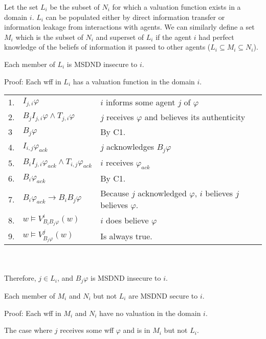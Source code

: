 Let the set $L_i$ be the subset of $N_i$ for which a valuation function exists in a domain $i$. $L_i$ can be populated either by direct information transfer or information leakage from interactions with agents. We can similarly define a set $M_i$ which is the subset of $N_i$ and superset of $L_i$ if the agent $i$ had perfect knowledge of the beliefs of information it passed to other agents ($L_i \subseteq M_i \subseteq N_i$).

\begin{thm}
Each member of $L_i$ is MSDND insecure to $i$.
\end{thm}

Proof: Each wff in $L_i$ has a valuation function in the domain $i$.

\begin{table}[h!]
\centering
\small
\begin{tabularx}{\linewidth}{l l X}
1. & $I_{j,i} \varphi$ & $i$ informs some agent $j$ of $\varphi$ \\
2. & $B_{j}I_{j,i} \varphi \wedge T_{j,i} \varphi$ & $j$ receives $\varphi$ and believes its authenticity \\
3  & $B_j \varphi$ & By C1. \\
4. & $I_{i,j} \varphi_{ack}$ & $j$ acknowledges $B_j \varphi$ \\
5. & $B_{i}I_{j,i} \varphi_{ack} \wedge T_{i,j} \varphi_{ack}$ & $i$ receives $\varphi_{ack}$ \\
6. & $B_{i} \varphi_{ack}$ & By C1. \\
7. & $B_{i} \varphi_{ack} \rightarrow B_i B_j \varphi$ & Because $j$ acknowledged $\varphi$, $i$ believes $j$ believes $\varphi$. \\
8. & $w \vDash V_{B_i B_j \varphi}^{i}(w)$ & $i$ does believe $\varphi$ \\
9. & $w \vDash V_{B_j \varphi}^{j}(w)$ & Is always true. %
\end{tabularx} \\~\\
Therefore, $j \in L_i$, and $B_j \varphi$ is MSDND insecure to $i$.
\label{tab:lsetsecurity}
\end{table}

\begin{thm}
Each member of $M_i$ and $N_i$ but not $L_i$ are MSDND secure to $i$.
\end{thm}

Proof: Each wff in $M_i$ and $N_i$ have no valuation in the domain $i$.

\begin{case}
The case where $j$ receives some wff $\varphi$ and is in $M_i$ but not $L_i$.
\end{case}


